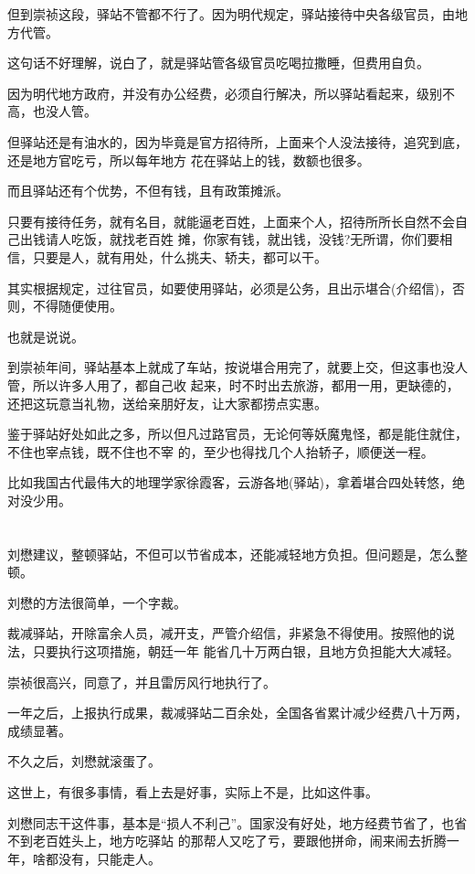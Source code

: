 \documentclass[11pt,a4paper,onecolumn]{article}
\begin{document}
但到崇祯这段，驿站不管都不行了。因为明代规定，驿站接待中央各级官员，由地方代管。

这句话不好理解，说白了，就是驿站管各级官员吃喝拉撒睡，但费用自负。

因为明代地方政府，并没有办公经费，必须自行解决，所以驿站看起来，级别不高，也没人管。

但驿站还是有油水的，因为毕竟是官方招待所，上面来个人没法接待，追究到底，还是地方官吃亏，所以每年地方
花在驿站上的钱，数额也很多。

而且驿站还有个优势，不但有钱，且有政策\myrule 摊派。

只要有接待任务，就有名目，就能逼老百姓，上面来个人，招待所所长自然不会自己出钱请人吃饭，就找老百姓
摊，你家有钱，就出钱，没钱?无所谓，你们要相信，只要是人，就有用处，什么挑夫、轿夫，都可以干。

其实根据规定，过往官员，如要使用驿站，必须是公务，且出示堪合(介绍信)，否则，不得随便使用。

也就是说说。

到崇祯年间，驿站基本上就成了车站，按说堪合用完了，就要上交，但这事也没人管，所以许多人用了，都自己收
起来，时不时出去旅游，都用一用，更缺德的，还把这玩意当礼物，送给亲朋好友，让大家都捞点实惠。

鉴于驿站好处如此之多，所以但凡过路官员，无论何等妖魔鬼怪，都是能住就住，不住也宰点钱，既不住也不宰
的，至少也得找几个人抬轿子，顺便送一程。

比如我国古代最伟大的地理学家徐霞客，云游各地(驿站)，拿着堪合四处转悠，绝对没少用。

\section[\thesection]{}

刘懋建议，整顿驿站，不但可以节省成本，还能减轻地方负担。但问题是，怎么整顿。

刘懋的方法很简单，一个字\myrule 裁。

裁减驿站，开除富余人员，减开支，严管介绍信，非紧急不得使用。按照他的说法，只要执行这项措施，朝廷一年
能省几十万两白银，且地方负担能大大减轻。

崇祯很高兴，同意了，并且雷厉风行地执行了。

一年之后，上报执行成果，裁减驿站二百余处，全国各省累计减少经费八十万两，成绩显著。

不久之后，刘懋就滚蛋了。

这世上，有很多事情，看上去是好事，实际上不是，比如这件事。

刘懋同志干这件事，基本是``损人不利己''。国家没有好处，地方经费节省了，也省不到老百姓头上，地方吃驿站
的那帮人又吃了亏，要跟他拼命，闹来闹去折腾一年，啥都没有，只能走人。
\end{document}
